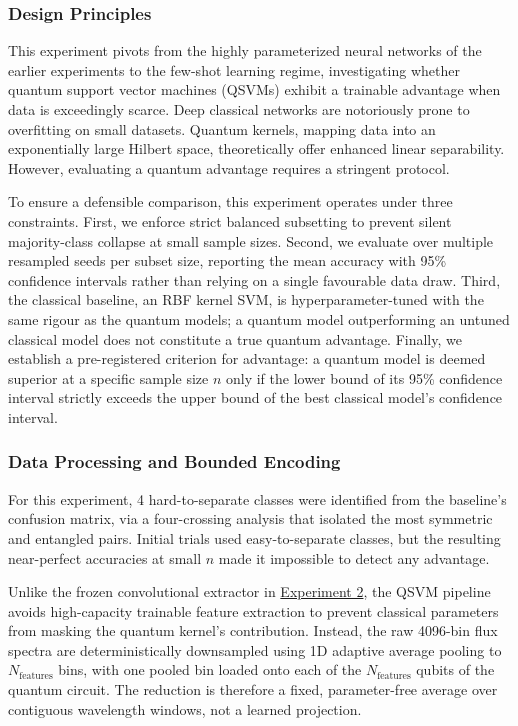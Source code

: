 \subsubsection{Design Principles}
\label{sec:exp3_philosophy}

This experiment pivots from the highly parameterized neural networks of the earlier experiments to the few-shot learning regime, investigating whether quantum support vector machines (QSVMs) exhibit a trainable advantage when data is exceedingly scarce. Deep classical networks are notoriously prone to overfitting on small datasets. Quantum kernels, mapping data into an exponentially large Hilbert space, theoretically offer enhanced linear separability. However, evaluating a quantum advantage requires a stringent protocol.

To ensure a defensible comparison, this experiment operates under three constraints. First, we enforce strict balanced subsetting to prevent silent majority-class collapse at small sample sizes. Second, we evaluate over multiple resampled seeds per subset size, reporting the mean accuracy with 95\% confidence intervals rather than relying on a single favourable data draw. Third, the classical baseline, an RBF kernel SVM, is hyperparameter-tuned with the same rigour as the quantum models; a quantum model outperforming an untuned classical model does not constitute a true quantum advantage. Finally, we establish a pre-registered criterion for advantage: a quantum model is deemed superior at a specific sample size $n$ only if the lower bound of its 95\% confidence interval strictly exceeds the upper bound of the best classical model's confidence interval.

\subsubsection{Data Processing and Bounded Encoding}
\label{sec:exp3_encoding}

For this experiment, 4 hard-to-separate classes were identified from the baseline's confusion matrix, via a four-crossing analysis that isolated the most symmetric and entangled pairs. Initial trials used easy-to-separate classes, but the resulting near-perfect accuracies at small $n$ made it impossible to detect any advantage.

Unlike the frozen convolutional extractor in \hyperref[sec:exp2_methods]{Experiment 2}, the
QSVM pipeline avoids high-capacity trainable feature extraction to prevent classical
parameters from masking the quantum kernel's contribution. Instead, the raw 4096-bin flux
spectra are deterministically downsampled using 1D adaptive average pooling to
$N_{\text{features}}$ bins, with one pooled bin loaded onto each of the
$N_{\text{features}}$ qubits of the quantum circuit. The reduction is therefore a fixed,
parameter-free average over contiguous wavelength windows, not a learned projection.

